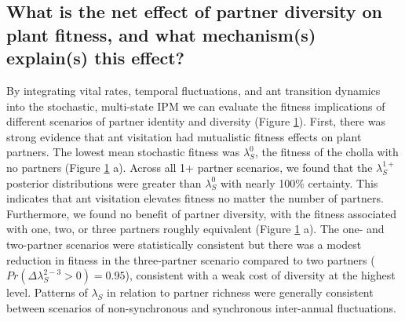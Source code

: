 \documentclass[11pt]{article}
\begin{document}
\subsection*{What is the net effect of partner diversity on plant fitness, and what mechanism(s) explain(s) this effect?}
By integrating vital rates, temporal fluctuations, and ant transition dynamics into the stochastic, multi-state IPM we can evaluate the fitness implications of different scenarios of partner identity and diversity (Figure \ref{fig:LambdaMeans}). 
First, there was strong evidence that ant visitation had mutualistic fitness effects on plant partners. 
The lowest mean stochastic fitness was $\lambda^{0}_{S}$, the fitness of the cholla with no partners (Figure \ref{fig:LambdaMeans} a).
Across all 1+ partner scenarios, we found that the $\lambda^{1+}_{S}$ posterior distributions were greater than $\lambda^{0}_{S}$ with nearly 100\% certainty.
This indicates that ant visitation elevates fitness no matter the number of partners.
Furthermore, we found no benefit of partner diversity, with the fitness associated with one, two, or three partners roughly equivalent (Figure \ref{fig:LambdaMeans} a).
The one- and two-partner scenarios were statistically consistent but there was a modest reduction in fitness in the three-partner scenario compared to two partners ($Pr(\Delta\lambda^{2-3}_{S} > 0)=0.95$), consistent with a weak cost of diversity at the highest level.
Patterns of $\lambda_{S}$ in relation to partner richness were generally consistent between scenarios of non-synchronous and synchronous inter-annual fluctuations. 

\begin{figure}
	\caption{}
	\label{fig:LambdaMeans}
\end{figure}
\end{document}
